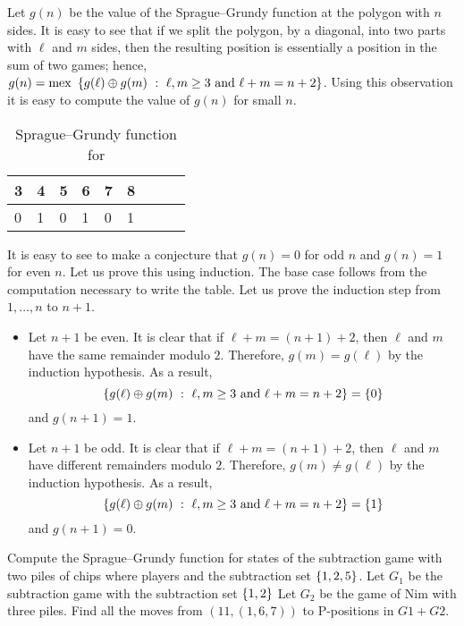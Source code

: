 Let $g(n)$ be the value of the Sprague--Grundy function at the polygon with $n$
sides. It is easy to see that if we split the polygon, by a diagonal, into two
parts with $\ell$ and $m$ sides, then the resulting position is essentially a
position in the sum of two games; 
hence, 
$g(n) = 
  \mex \set[
    \ell, m \ge 3 \text{ and } \ell + m = n + 2
  ]{g(\ell) \bitwisexor g(m)}$.
Using this observation it is easy to compute the value of $g(n)$ for small $n$.
\begin{table}[h!]
  \centering
  \begin{tabular}{l l l l l l l l l}
      \toprule
      3 & 4 & 5 & 6 & 7 & 8 \\
      \midrule
      0 & 1 & 0 & 1 & 0 & 1 \\
      \bottomrule
  \end{tabular}
  \caption{Sprague--Grundy function for }
\end{table}
It is easy to see to make a conjecture that $g(n) = 0$ for odd $n$ and $g(n) =
1$ for even $n$. Let us prove this using induction. The base case follows from
the computation necessary to write the table. Let us prove the induction step
from $1, \dots, n$ to $n + 1$.
\begin{itemize}
  \item Let $n + 1$ be even. It is clear that if $\ell + m = (n + 1) + 2$, then
    $\ell$ and $m$ have the same remainder modulo $2$. Therefore, $g(m) =
    g(\ell)$ by the induction hypothesis. As a result, 
    \[
      \set[
        \ell, m \ge 3 \text{ and } \ell + m = n + 2
      ]{g(\ell) \bitwisexor g(m)} = \set{0}
    \] 
    and $g(n + 1) = 1$.    
  \item Let $n + 1$ be odd. It is clear that if $\ell + m = (n + 1) + 2$, then
    $\ell$ and $m$ have different remainders modulo $2$. Therefore, $g(m) \neq
    g(\ell)$ by the induction hypothesis. As a result, 
    \[
      \set[
        \ell, m \ge 3 \text{ and } \ell + m = n + 2
      ]{g(\ell) \bitwisexor g(m)} = \set{1}
    \] 
    and $g(n + 1) = 0$.
\end{itemize}
\begin{chapterendexercises}
    \exercise Compute the Sprague--Grundy function for states of the subtraction
      game with two piles of chips where players and the subtraction set 
      $\set{1, 2, 5}$.
    \exercise Let $G_1$ be the subtraction game with the subtraction set
      $\set{1, 2}$
      Let $G_2$ be the game of Nim with three piles.
      Find all the moves from $(11, (1, 6, 7))$ to P-positions in 
      $G1 + G2$.
\end{chapterendexercises}

